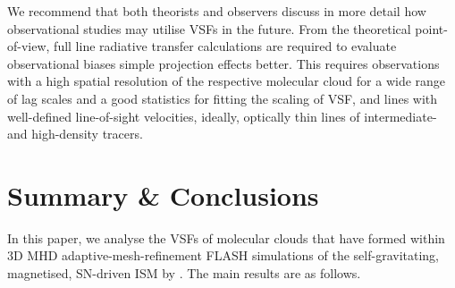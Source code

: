 \documentclass{aa}		%
\begin{document}
We recommend that both theorists and observers discuss in more detail how observational studies may utilise VSFs in the future.
From the theoretical point-of-view, full line radiative transfer calculations are required to evaluate observational biases simple projection effects better.
This requires observations with a high spatial resolution of the respective molecular cloud for a wide range of lag scales and a good statistics for fitting the scaling of VSF, and lines with well-defined line-of-sight velocities, ideally, optically thin lines of intermediate- and high-density tracers. 


\section{Summary \& Conclusions}\label{conclusions}

In this paper, we analyse the VSFs of molecular clouds that have formed within 3D MHD adaptive-mesh-refinement FLASH simulations of the self-gravitating, magnetised, SN-driven ISM by .
The main results are as follows.
\end{document}
